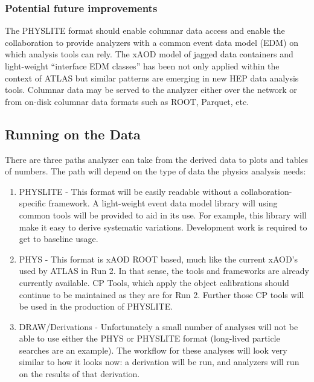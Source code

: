 
\subsubsection{Potential future improvements}
The {\sc PHYSLITE} format should enable columnar data access and enable the collaboration to provide analyzers with a common event data model (EDM) on which analysis tools can rely. The xAOD model of jagged data containers and light-weight ``interface EDM classes'' has been not only applied within the context of ATLAS but similar patterns are emerging in new HEP data analysis tools.  Columnar data may be served to the analyzer either over the network or from on-disk columnar data formats such as ROOT, Parquet, etc.

\subsection{Running on the Data}

There are three paths analyzer can take from the derived data  to plots and tables of numbers. The path will depend on the type of data the physics analysis needs:
\begin{enumerate}
    \item PHYSLITE - This format will be easily readable without a collaboration-specific framework. A light-weight event data model library will using common tools will be provided to aid in its use. For example, this library will make it easy to derive systematic variations. Development work is required to get to baseline usage.
    \item PHYS - This format is xAOD ROOT based, much like the current xAOD's used by ATLAS in Run 2. In that sense, the tools and frameworks are already currently available. CP Tools, which apply the object calibrations should continue to be maintained as they are for Run 2. Further those CP tools will be used in the production of PHYSLITE.
    \item DRAW/Derivations - Unfortunately a small number of analyses will not be able to use either the PHYS or PHYSLITE format (long-lived particle searches are an example). The workflow for these analyses will look very similar to how it looks now: a derivation will be run, and analyzers will run on the results of that derivation. 
\end{enumerate}

